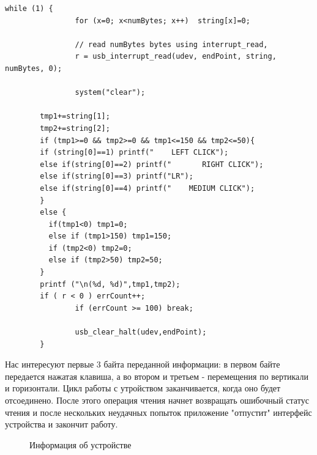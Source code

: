 \documentclass[14pt,a4paper]{article}
\begin{document}
\begin{lstlisting}[language=c caption={Чтение данных }]
while (1) {  
                for (x=0; x<numBytes; x++)  string[x]=0;
                
                // read numBytes bytes using interrupt_read,
                r = usb_interrupt_read(udev, endPoint, string, numBytes, 0); 
                
                system("clear");
		
		tmp1+=string[1];
		tmp2+=string[2];
		if (tmp1>=0 && tmp2>=0 && tmp1<=150 && tmp2<=50){
		if (string[0]==1) printf("    LEFT CLICK");
		else if(string[0]==2) printf("       RIGHT CLICK");
		else if(string[0]==3) printf("LR");
		else if(string[0]==4) printf("    MEDIUM CLICK");
		}
		else {
		  if(tmp1<0) tmp1=0;
		  else if (tmp1>150) tmp1=150;
		  if (tmp2<0) tmp2=0;
		  else if (tmp2>50) tmp2=50;
		}
		printf ("\n(%d, %d)",tmp1,tmp2);
		if ( r < 0 ) errCount++;
                if (errCount >= 100) break; 
        
                usb_clear_halt(udev,endPoint); 
        }
 \end{lstlisting}      

Нас интересуют первые 3 байта переданной информации: в первом байте передается нажатая клавиша, а во втором и третьем - перемещения по вертикали и горизонтали. Цикл работы с утройством заканчивается, когда оно будет отсоединено. После этого операция чтения начнет возвращать ошибочный статус чтения и после нескольких неудачных попыток приложение "отпустит" интерфейс устройства и закончит работу.


\begin{figure}[H]
  \centering
  \caption{Информация об устройстве}
\end{figure}
\end{document}
